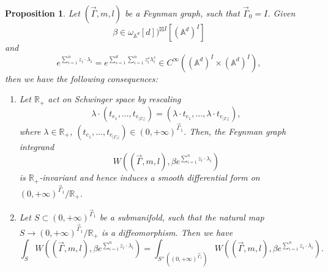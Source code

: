 \documentclass[11pt]{amsart}
\newtheorem{prop}[thm]{Proposition}
\theoremstyle{definition}
\theoremstyle{remark}
\numberwithin{equation}{section}
\begin{document}
\begin{prop}\label{useful property}
    Let $(\vec{\Gamma},m,l)$ be a Feynman graph, such that $\vec{\Gamma}_{0}= I$. Given 
    $$
    \beta\in \omega_{\mathbb{A}^{d}}[d])^{\boxtimes I}[(\mathbb{A}^{d})^{ I}]
    $$
    and
    $$
    e^{\sum_{i=1}^{n}z_{i}\cdot\lambda_{i}}=e^{\sum_{s=1}^{d}\sum_{i=1}^{n}z^{s}_{i}\lambda^{s}_{i}}\in C^{\infty}((\mathbb{A}^{d})^{ I}\times (\mathbb{A}^{d})^{ I}),
    $$
    then we have the following consequences:
    \begin{enumerate}
        \item 
        Let $\mathbb{R}_{+}$ act on Schwinger space by rescaling
        $$
        \lambda\cdot(t_{e_{1}},\dots,t_{e_{|\Gamma_{1}|}})=(\lambda\cdot t_{e_{1}},\dots,\lambda\cdot t_{e_{|\Gamma_{1}|}}),
        $$
        where $\lambda\in \mathbb{R}_+$, $(t_{e_{1}},\dots,t_{e_{|\Gamma_{1}|}})\in (0,+\infty)^{\vec{\Gamma}_{1}}$.
        Then, the Feynman graph integrand
        $$
        W((\vec{\Gamma},m,l),\beta e^{\sum_{i=1}^{n}z_{i}\cdot\lambda_{i}})
        $$
        is $\mathbb{R}_+$-invariant and hence induces a smooth differential form on $(0,+\infty)^{\vec{\Gamma}_{1}}/\mathbb{R}_+$. 
        \item Let $S\subset(0,+\infty)^{\vec{\Gamma}_{1}}$ be a submanifold, such that the natural map $S\rightarrow(0,+\infty)^{\vec{\Gamma}_{1}}/\mathbb{R}_+$ is a diffeomorphism. Then we have
        $$
        \int_{S}W((\vec{\Gamma},m,l),\beta e^{\sum_{i=1}^{n}z_{i}\cdot\lambda_{i}})=
        \int_{S^{+}((0,+\infty)^{\vec{\Gamma}_{1}})}W((\vec{\Gamma},m,l),\beta e^{\sum_{i=1}^{n}z_{i}\cdot\lambda_{i}}).
        $$
    \end{enumerate}
\end{prop}
\end{document}

